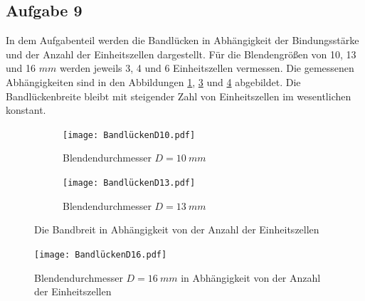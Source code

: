 \subsection{Aufgabe 9}
In dem Aufgabenteil werden die Bandlücken in Abhängigkeit der Bindungsstärke und der Anzahl der Einheitszellen dargestellt.
Für die Blendengrößen von 10, 13 und 16 $\si{mm}$ werden jeweils 3, 4 und 6 Einheitszellen vermessen.
Die gemessenen Abhängigkeiten sind in den Abbildungen \ref{fig.Aufgabe9}, \ref{fig.Aufgabe91} und \ref{fig.Aufgabe92} abgebildet.
Die Bandlückenbreite bleibt mit steigender Zahl von Einheitszellen im wesentlichen konstant.
  \begin{figure}
   \centering
   \begin{subfigure}{0.48\textwidth}
    \centering
    \texttt{[image: BandlückenD10.pdf]}
    \caption{Blendendurchmesser $D=\SI{10}{mm}$}
    \label{fig.Aufgabe9}
   \end{subfigure}
   \begin{subfigure}{0.48\textwidth}
    \centering
    \texttt{[image: BandlückenD13.pdf]}
    \caption{Blendendurchmesser $D=\SI{13}{mm}$}
    \label{fig.Aufgabe91}
   \end{subfigure}
   \caption{Die Bandbreit in Abhängigkeit von der Anzahl der Einheitszellen}
  \end{figure}
  \begin{figure}[h!]
    \centering
    \texttt{[image: BandlückenD16.pdf]}
    \caption{Blendendurchmesser $D=\SI{16}{mm}$ in Abhängigkeit von der Anzahl der Einheitszellen}
    \label{fig.Aufgabe92}
  \end{figure}
  \FloatBarrier

